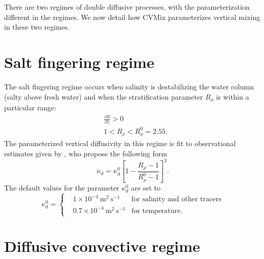 There are two regimes of double diffusive processes, with the
parameterization different in the regimes.  We now detail how CVMix
parameterizes vertical mixing in these two regimes.  


\section{Salt fingering regime}
\label{section:salt-fingering-param}

The salt fingering regime occurs when salinity is destabilizing the
water column (salty above fresh water) and when the stratification
parameter $ R_{\rho}$ is within a particular range:
\begin{align}
  &\frac{\partial S}{\partial z} > 0 
 \\
  &1 < R_{\rho} < R_{\rho}^0    = 2.55.
\end{align}
The parameterized vertical diffusivity in this regime is fit to
observational estimates given by \cite{StLaurentSchmitt1999}, who
propose the following form 
\begin{equation}
\kappa_d = \kappa_d^0 \left[1-\frac{{R_{\rho}-1}}{{R_{\rho}^0 -1}}\right]^3.
\label{eq:kappadsf}
\end{equation}
The default values for the parameter $\kappa_d^0$ are set to
\begin{equation}
   \kappa_d^0   = \left\{  \begin{array}{lll} 
    &1 \times 10^{-4}~\mbox{m}^{2}~\mbox{s}^{-1} &\mbox{for salinity and other tracers} 
  \\
    &0.7 \times 10^{-4}~\mbox{m}^{2}~\mbox{s}^{-1} &\mbox{for temperature.} 
  \end{array}
 \right. 
\end{equation}


\section{Diffusive convective regime}
\label{section:diffusive-convective-param}

